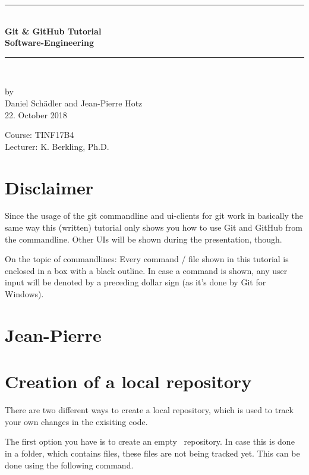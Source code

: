 \documentclass[a4paper, 12pt]{article}
\begin{document}
	
	
	\begin{center}
		\newcommand{\HRule}{\rule{\linewidth}{0.5mm}}
		\HRule \\[0.8cm]
		{ \huge \bfseries Git \& GitHub Tutorial}\\[0.4cm]
		{\LARGE \bfseries Software-Engineering}\\[0.4cm]
		\HRule \\[1.5cm]
		\begin{center}
			by\\[0.2cm]
			Daniel Schädler and Jean-Pierre Hotz\\[0.7cm]
			22. October 2018
		\end{center}
		\vfill
		Course: TINF17B4\\
		Lecturer: K. Berkling, Ph.D.
	\end{center}
	\newpage
	\pagestyle{fancy}

	
	\section*{Disclaimer}
		
		Since the usage of the git commandline and ui-clients for git work in basically the same way this (written) tutorial only shows you how to use Git and GitHub from the commandline. Other UIs will be shown during the presentation, though.
		
		On the topic of commandlines: Every command / file shown in this tutorial is enclosed in a box with a black outline. In case a command is shown, any user input will be denoted by a preceding dollar sign (as it's done by Git for Windows).

	\section{Jean-Pierre}
		
	\section{Creation of a local repository}
	
		There are two different ways to create a local repository, which is used to track your own changes in the exisiting code.
		
		The first option you have is to create an \glqq empty\grqq~ repository. In case this is done in a folder, which contains files, these files are not being tracked yet. This can be done using the following command.
		
\end{document}
